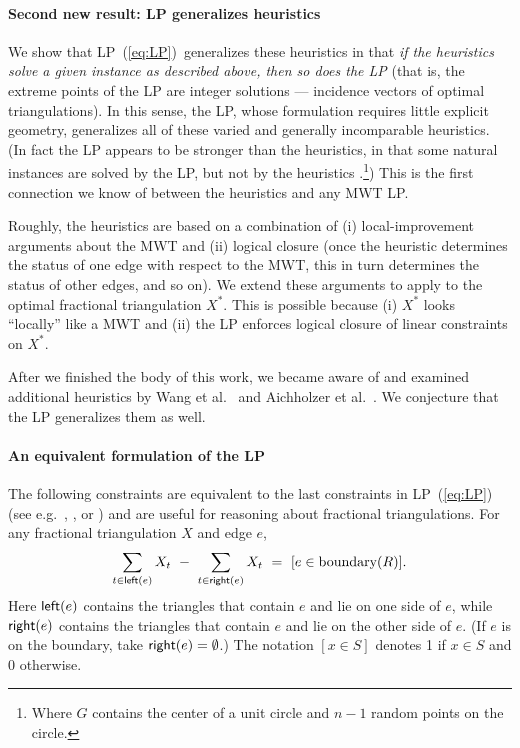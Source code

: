 \documentclass[final]{siamltex}
\newcommand{\leftside}{\text{\sf left}}
\newcommand{\rightside}{\text{\sf right}}
\newcommand{\refLP}{(\ref{eq:LP})\xspace}
\newcommand{\edge}{e}
\newcommand{\graph}{G}
\newcommand{\region}{R}
\newcommand{\tri}{t}  \newcommand{\vertex}{v}
\newcommand{\fracTriang}{X}
\begin{document}
\paragraph{Second new result: LP generalizes heuristics}
We show that 
LP~\refLP\ generalizes these heuristics
in that {\em if the heuristics solve a given instance
as described above, then so does the LP}
(that is, the extreme points of the LP are integer solutions --- incidence vectors of optimal triangulations).
In this sense, the LP, whose formulation requires little explicit geometry,
generalizes all of these varied and generally incomparable heuristics.
(In fact the LP appears to be stronger than the heuristics, in that some natural instances
are solved by the LP, but not by the heuristics
\cite[\S 3.5]{kirsanov2004minimal}.\footnote
{Where $\graph$ contains the center of a unit circle and $n-1$ random points on the circle.})
This is the first connection we know of between the heuristics and any MWT LP.

Roughly, the heuristics are based on a combination of
(i) local-improvement arguments about the MWT and
(ii) logical closure (once the heuristic determines the status of one edge with respect to the MWT,
this in turn determines the status of other edges, and so on).
We extend these arguments to apply to the optimal fractional triangulation $\fracTriang^*$.
This is possible because
(i) $\fracTriang^*$  looks ``locally'' like a MWT and 
(ii) the LP enforces logical closure of linear constraints on $\fracTriang^*$.


After we finished the body of this work, we became aware of
and examined additional heuristics by Wang et al.~\cite{wang1997new} 
and Aichholzer et al.~\cite{aichholzer1996triangulations}.
We conjecture that the LP generalizes them as well.

\paragraph{An equivalent formulation of the LP}
The following constraints are equivalent to the last constraints in LP~\refLP
(see e.g.~\cite[Thm.~1.1(i), Prop.~2.5]{de1996polytope},
\cite{takeuchi1998polytopes}, or \cite[Thm.~3.4.1]{kirsanov2004minimal})
and are useful for reasoning about fractional triangulations.
For any fractional triangulation $\fracTriang$ and edge $\edge$,
\begin{equation} \label{constraint:edge}
\sum_{\tri\in \leftside(\edge)} \fracTriang_\tri ~-~ \sum_{\tri\in \rightside(\edge)} \fracTriang_\tri ~=~ [\edge\in \text{boundary}(\region)].
\end{equation}
Here $\leftside(\edge)$ contains the triangles that contain $\edge$ and lie on one side of $\edge$,
while $\rightside(\edge)$ contains the triangles that contain $\edge$ and lie on the other side of $\edge$.
(If $\edge$ is on the boundary, take $\rightside(\edge)=\emptyset$.)
The notation $[x\in S]$ denotes 1 if $x\in S$ and 0 otherwise.
\end{document}

